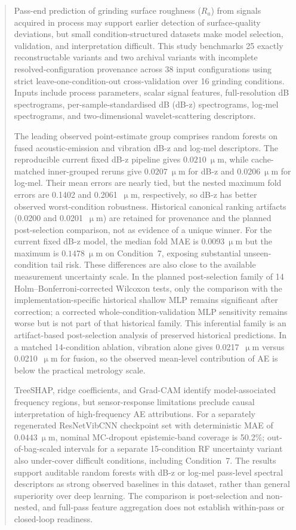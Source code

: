 \begin{abstract}
Pass-end prediction of grinding surface roughness (\(R_a\)) from signals
acquired in process may support
earlier detection of surface-quality deviations, but small condition-structured
datasets make model selection, validation, and interpretation difficult. This
study benchmarks 25 exactly reconstructable variants and two archival variants
with incomplete resolved-configuration provenance across 38 input configurations using
strict leave-one-condition-out cross-validation over 16 grinding conditions.
Inputs include process parameters, scalar signal features, full-resolution dB
spectrograms, per-sample-standardised dB (dB-z) spectrograms, log-mel
spectrograms, and two-dimensional wavelet-scattering descriptors.

The leading observed point-estimate group comprises random forests on fused
acoustic-emission and vibration dB-z and log-mel descriptors. The
reproducible current fixed dB-z pipeline gives \(0.0210~\upmu\)m, while
cache-matched inner-grouped reruns give \(0.0207~\upmu\)m for dB-z and
\(0.0206~\upmu\)m for log-mel. Their mean errors are nearly tied, but the
nested maximum fold errors are 0.1402 and 0.2061~\(\upmu\)m, respectively,
so dB-z has better observed worst-condition robustness. Historical canonical ranking artifacts
(0.0200 and 0.0201~\(\upmu\)m) are retained for provenance and the planned
post-selection comparison, not as evidence of a unique winner. For the
current fixed dB-z model, the median fold MAE is \(0.0093~\upmu\)m but the
maximum is \(0.1478~\upmu\)m on Condition~7, exposing substantial unseen-condition
tail risk. These differences are also close to the available measurement
uncertainty scale. In the planned post-selection family of 14
Holm--Bonferroni-corrected Wilcoxon tests, only the comparison with the
implementation-specific historical shallow MLP remains significant after
correction; a corrected whole-condition-validation MLP sensitivity remains
worse but is not part of that historical family. This inferential family is an
artifact-based post-selection analysis of preserved historical predictions.
In a matched 14-condition ablation, vibration alone gives 0.0217~\(\upmu\)m
versus 0.0210~\(\upmu\)m for fusion, so the observed mean-level contribution
of AE is below the practical metrology scale.

TreeSHAP, ridge coefficients, and Grad-CAM identify model-associated
frequency regions, but sensor-response limitations preclude causal
interpretation of high-frequency AE attributions. For a separately regenerated
ResNetVibCNN checkpoint set with deterministic MAE of \(0.0443~\upmu\)m,
nominal MC-dropout epistemic-band coverage is 50.2\%; out-of-bag-scaled intervals for a separate 15-condition RF uncertainty variant also
under-cover difficult conditions, including
Condition~7. The results support auditable random forests with dB-z or
log-mel pass-level spectral descriptors as strong observed baselines in this
dataset, rather than general superiority over deep learning. The comparison
is post-selection and non-nested, and full-pass feature aggregation does not
establish within-pass or closed-loop readiness.
\end{abstract}
